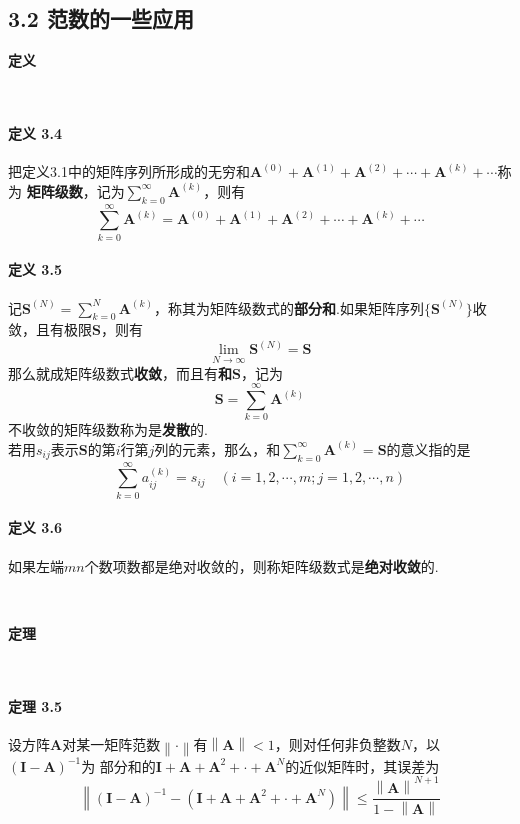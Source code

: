 \documentclass[12pt, a4paper, oneside, fontset=none]{ctexart}
\begin{document}
\subsection*{3.2 \quad 范数的一些应用}

\centerline{\large{\textbf{定义}}} \ \par

\paragraph*{定义 3.4} 把定义3.1中的矩阵序列所形成的无穷和$\bm{A}^{(0)} + \bm{A}^{(1)} + \bm{A}^{(2)} + \cdots + \bm{A}^{(k)} + \cdots$称为
\textbf{矩阵级数}，记为$\sum_{k=0}^\infty \bm{A}^{(k)}$，则有
\[
    \sum_{k=0}^\infty \bm{A}^{(k)} = \bm{A}^{(0)} + \bm{A}^{(1)} + \bm{A}^{(2)} + \cdots + \bm{A}^{(k)} + \cdots
\]

\paragraph*{定义 3.5} 记$\bm{S}^{(N)} = \sum_{k = 0}^N \bm{A}^{(k)}$，称其为矩阵级数式的\textbf{部分和}.如果矩阵序列$\{\bm{S}^{(N)}\}$收敛，且有极限$\bm{S}$，则有
\[
    \lim_{N\to \infty} \bm{S}^{(N)} = \bm{S}
\]
那么就成矩阵级数式\textbf{收敛}，而且有\textbf{和}$\bm{S}$，记为
\[
    \bm{S} = \sum_{k = 0}^\infty \bm{A}^{(k)}
\]
不收敛的矩阵级数称为是\textbf{发散}的. \\
若用$s_{ij}$表示$\bm{S}$的第$i$行第$j$列的元素，那么，和$\sum_{k=0}^\infty \bm{A}^{(k)} = \bm{S}$的意义指的是
\[
    \sum_{k=0}^\infty a_{ij}^{(k)} = s_{ij} \quad (i = 1,2,\cdots,m;j = 1,2,\cdots,n)
\]

\paragraph*{定义 3.6} 如果左端$mn$个数项数都是绝对收敛的，则称矩阵级数式是\textbf{绝对收敛}的.

\par \ \par

\centerline{\large{\textbf{定理}}} \ \par

\paragraph*{定理 3.5} 设方阵$\bm{A}$对某一矩阵范数$\left\lVert \bm{\cdot}\right\rVert$有$\left\lVert \bm{A}\right\rVert < 1$，则对任何非负整数$N$，以$(\bm{I} - \bm{A})^{-1}$为
部分和的$\bm{I} + \bm{A} + \bm{A}^2 + \cdot + \bm{A}^N$的近似矩阵时，其误差为
\[
    \left\lVert (\bm{I} - \bm{A})^{-1} - (\bm{I} + \bm{A} + \bm{A}^2 + \cdot + \bm{A}^N) \right\rVert \leqslant \frac{\left\lVert \bm{A}\right\rVert ^{N + 1}}{1 - \left\lVert \bm{A}\right\rVert}
\]
\end{document}

